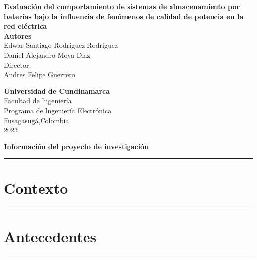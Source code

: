 \documentclass[12pt,twoside]{article}
\date{}
\begin{document}
\begin{titlepage}
\begin{center}

{\Large \textbf{Evaluación del comportamiento de sistemas de almacenamiento por baterías bajo la influencia de fenómenos de calidad de potencia en la red eléctrica}}\\%
\vspace*{2\baselineskip}
\textbf{Autores}\\
\vspace*{0.2\baselineskip}
Edwar Santiago Rodriguez Rodriguez \\[0.2cm]
Daniel Alejandro Moya Diaz\\[0.2cm]

\vspace*{3.5\baselineskip}
Director:\\
Andres Felipe Guerrero\\
\vspace*{2\baselineskip}


\vfill %
\textbf{Universidad de Cundinamarca} \\
Facultad de Ingeniería\\
Programa de Ingeniería Electrónica\\
Fusagasug\'{a},Colombia\\
2023

\end{center}
\end{titlepage}
\newpage
\begin{center}
{\LARGE \textbf{Información del proyecto de investigación }}
\end{center}
\vspace*{0.09\baselineskip}
\hrule
\vspace*{0.2\baselineskip}

\newpage
\section{Contexto}
\vspace*{0.08\baselineskip}
\hrule
\vspace*{0.2\baselineskip}


\newpage
\section{Antecedentes}
\vspace*{0.08\baselineskip}
\hrule
\vspace*{0.7\baselineskip}

\end{document}
